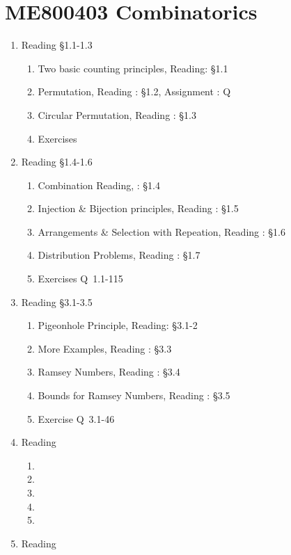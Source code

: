 \chapter{ME800403 Combinatorics}
\begin{enumerate}[label=Week \arabic*]
	\item Reading \S1.1-1.3 
	\begin{enumerate}[label=Day \arabic*]
		\item Two basic counting principles, Reading: \S1.1
		\item Permutation, Reading : \S1.2, Assignment : Q
		\item Circular Permutation, Reading : \S1.3
		\item Exercises
	\end{enumerate}
	\item Reading \S1.4-1.6 
	\begin{enumerate}[label=Day \arabic*]
		\item Combination Reading, : \S1.4
		\item Injection \&  Bijection principles, Reading : \S1.5
		\item Arrangements \& Selection with Repeation, Reading : \S1.6
		\item Distribution Problems, Reading : \S1.7
		\item Exercises Q\ 1.1-115
	\end{enumerate}
	\item Reading \S3.1-3.5 
	\begin{enumerate}[label=Day \arabic*]
		\item Pigeonhole Principle, Reading: \S3.1-2
		\item More Examples, Reading : \S3.3
		\item Ramsey Numbers, Reading : \S3.4
		\item Bounds for Ramsey Numbers, Reading : \S3.5
		\item Exercise Q\ 3.1-46
	\end{enumerate}
	\item Reading
	\begin{enumerate}[label=Day \arabic*]
		\item 
		\item 
		\item
		\item
		\item
	\end{enumerate}
	\item Reading
	\begin{enumerate}[label=Day \arabic*]

\end{enumerate}
\end{enumerate}
